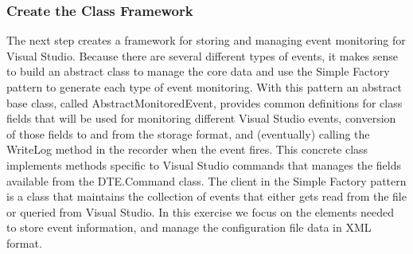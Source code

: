 \subsubsection{Create the Class Framework}

The next step creates a framework for storing and managing event monitoring for Visual Studio.  Because there are several different types of events, it makes sense to build an abstract class to manage the core data and use the Simple Factory pattern to generate each type of event monitoring.  With this pattern an abstract base class, called AbstractMonitoredEvent, provides common definitions for class fields that will be used for monitoring different Visual Studio events, conversion of those fields to and from the storage format, and (eventually) calling the WriteLog method in the recorder when the event fires.  This concrete class implements methods specific to Visual Studio commands that manages the fields available from the DTE.Command class.  The client in the Simple Factory pattern is a class that maintains the collection of events that either gets read from the file or queried from Visual Studio.   In this exercise we focus on the elements needed to store event information, and manage the configuration file data in XML format.

